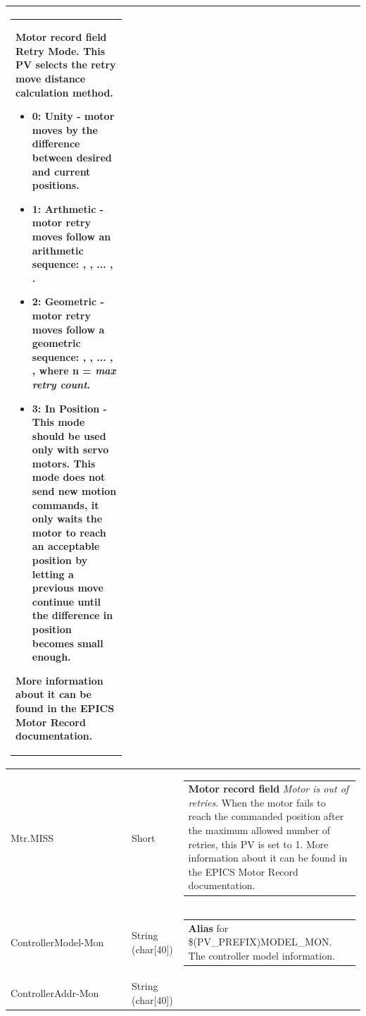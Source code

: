 \documentclass[openany]{article}
\begin{document}
\begin{longtable}{| m{4.5cm} m{2.5cm}  m{8.5cm} |}
\begin{tabular}{@{}m{6cm}@{}}
                \textbf{\color{ForestGreen} Motor record field} Retry Mode. This PV selects the retry move distance calculation method.
                \begin{itemize}
                    \item 0: Unity - motor moves by the difference between desired and current positions.
                    \item 1: Arthmetic - motor retry moves follow an arithmetic sequence: $positionDiff \times 1$, $positionDiff \times\frac{maxRetryCount - 1}{maxRetryCount}$, ... , $positionDiff \times\frac{1}{maxRetryCount}$.
                    \item 2: Geometric - motor retry moves follow a geometric sequence: $positionDiff \times 1$, $positionDiff \times\frac{1}{2}$, ... , $positionDiff \times\frac{1}{2^{n}}$, where n = \emph{max retry count}.
                    \item 3: In Position - This mode should be used only with servo motors. This mode does not send new motion commands, it only waits the motor to reach an acceptable position by letting a previous move continue until the difference in position becomes small enough.
                \end{itemize}
More information about it can be found in the EPICS Motor Record documentation.
            \end{tabular} \hypertarget{pv:mtr-miss}{}\\ \hline
        Mtr.MISS & Short & \begin{tabular}{@{}m{6cm}@{}}
                \textbf{\color{ForestGreen} Motor record field} \emph{Motor is out of retries}. When the motor fails to reach the commanded position after the maximum allowed number of retries, this PV is set to 1. More information about it can be found in the EPICS Motor Record documentation.
            \end{tabular} \hypertarget{pv:controller-model-mon}{}\\ \hline
        ControllerModel-Mon & String (char[40]) & \begin{tabular}{@{}m{6cm}@{}}
                \textbf{\color{blue} Alias} for \$(PV\_PREFIX)MODEL\_MON. The controller model information.
            \end{tabular} \hypertarget{pv:controller-addr-mon}{}\\ \hline
        ControllerAddr-Mon & String (char[40]) & \begin{tabular}{@{}m{6cm}@{}}

\end{tabular}
\end{longtable}
\end{document}

